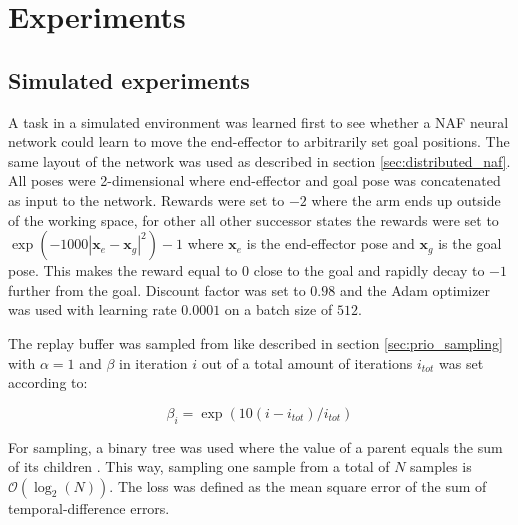 \section{Experiments}

\subsection{Simulated experiments}

A task in a simulated environment was learned first to see whether a NAF neural
network could learn to move the end-effector to arbitrarily set goal positions.
The same layout of the network was used as described in section
\ref{sec:distributed_naf}. All poses were 2-dimensional where end-effector and
goal pose was concatenated as input to the network. Rewards were set to $-2$
where the arm ends up outside of the working space, for other all other
successor states the rewards were set to $\exp\left(-1000|\mathbf{x}_e -
\mathbf{x}_g|^2\right) - 1$ where $\mathbf{x}_e$ is the end-effector pose and
$\mathbf{x}_g$ is the goal pose. This makes the reward equal to $0$ close to
the goal and rapidly decay to $-1$ further from the goal. Discount factor was
set to $0.98$ and the Adam optimizer was used with learning rate $0.0001$ on a
batch size of $512$.

The replay buffer was sampled from like described in section
\ref{sec:prio_sampling} with $\alpha = 1$ and $\beta$ in iteration $i$ out of a
total amount of iterations $i_{tot}$ was set according to:

\begin{equation}
    \beta_i = \exp \left( 10(i - i_{tot}) / i_{tot}\right)
\end{equation}

For sampling, a binary tree was used where the value of a parent equals the
sum of its children \cite{schaul2015prioritized}. This way, sampling one
sample from a total of $N$ samples is $\mathcal{O}(\log_2(N))$. The loss
was defined as the mean square error of the sum of temporal-difference
errors.

